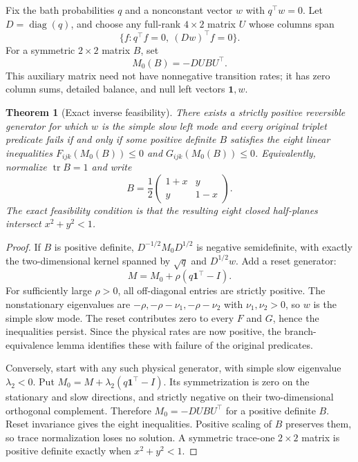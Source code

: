 \documentclass[11pt]{article}
\newtheorem{theorem}{Theorem}
\begin{document}
Fix the bath probabilities $q$ and a nonconstant vector $w$ with $q^\top w=0$.
Let $D=\operatorname{diag}(q)$, and choose any full-rank $4\times2$ matrix $U$
whose columns span
\[
\{f:q^\top f=0,\ (Dw)^\top f=0\}.
\]
For a symmetric $2\times2$ matrix $B$, set
\[
M_0(B)=-DU B U^\top.
\]
This auxiliary matrix need not have nonnegative transition rates; it has
zero column sums, detailed balance, and null left vectors $\mathbf1,w$.

\begin{theorem}[Exact inverse feasibility]\label{thm:inversefeasibility}
There exists a strictly positive reversible generator for which $w$ is the
simple slow left mode and every original triplet predicate fails if and only
if some positive definite $B$ satisfies the eight linear inequalities
$F_{ijk}(M_0(B))\leq0$ and $G_{ijk}(M_0(B))\leq0$.
Equivalently, normalize $\operatorname{tr}B=1$ and write
\[
B=\frac12\begin{pmatrix}1+x&y\\y&1-x\end{pmatrix}.
\]
The exact feasibility condition is that the resulting eight closed
half-planes intersect $x^2+y^2<1$.
\end{theorem}
\begin{proof}
If $B$ is positive definite, $D^{-1/2}M_0D^{1/2}$ is negative semidefinite,
with exactly the two-dimensional kernel spanned by $\sqrt q$ and
$D^{1/2}w$. Add a reset generator:
\[
M=M_0+\rho(q\mathbf1^\top-I).
\]
For sufficiently large $\rho>0$, all off-diagonal entries are strictly
positive. The nonstationary eigenvalues are $-\rho,-\rho-\nu_1,
-\rho-\nu_2$ with $\nu_1,\nu_2>0$, so $w$ is the simple slow mode.
The reset contributes zero to every $F$ and $G$, hence the inequalities
persist. Since the physical rates are now positive, the branch-equivalence
lemma identifies these with failure of the original predicates.

Conversely, start with any such physical generator, with simple slow
eigenvalue $\lambda_2<0$. Put
$M_0=M+\lambda_2(q\mathbf1^\top-I)$. Its symmetrization is zero on the
stationary and slow directions, and strictly negative on their two-dimensional
orthogonal complement. Therefore $M_0=-DU B U^\top$ for a positive definite
$B$. Reset invariance gives the eight inequalities. Positive scaling of $B$
preserves them, so trace normalization loses no solution. A symmetric trace-one
$2\times2$ matrix is positive definite exactly when $x^2+y^2<1$.
\end{proof}
\end{document}
